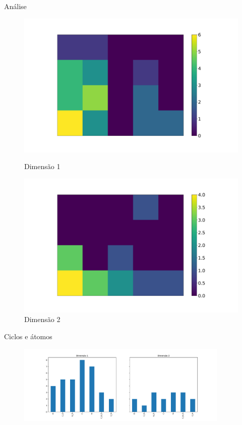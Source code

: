 \documentclass[10pt]{beamer}
\begin{document}
\begin{frame}{Análise}
  \begin{figure}
    \centering
    \begin{minipage}{0.45\textwidth}
        \centering
        \includegraphics[width=1.1\textwidth]{images/heatmap_1.pdf} %
        \caption{Dimensão 1}
    \end{minipage}\hfill
    \begin{minipage}{0.45\textwidth}
        \centering
        \includegraphics[width=1.1\textwidth]{images/heatmap_2} %
        \caption{Dimensão 2}
    \end{minipage}
  \end{figure}
\end{frame}

\begin{frame}{Ciclos e átomos}
    \begin{figure}
        \centering
        \includegraphics[width=0.9\textwidth]{../images/plt_dim.pdf}
    \end{figure}
\end{frame}
\end{document}
